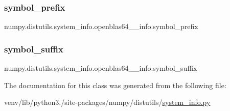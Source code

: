 \subsubsection{\texorpdfstring{symbol\+\_\+prefix}{symbol\_prefix}}
{\footnotesize\ttfamily numpy.\+distutils.\+system\+\_\+info.\+openblas64\+\_\+\+\_\+info.\+symbol\+\_\+prefix\hspace{0.3cm}{\ttfamily [static]}}

\mbox{\label{classnumpy_1_1distutils_1_1system__info_1_1openblas64____info_a175fe499504d066f993832a0ca001755}} 
\subsubsection{\texorpdfstring{symbol\+\_\+suffix}{symbol\_suffix}}
{\footnotesize\ttfamily numpy.\+distutils.\+system\+\_\+info.\+openblas64\+\_\+\+\_\+info.\+symbol\+\_\+suffix\hspace{0.3cm}{\ttfamily [static]}}



The documentation for this class was generated from the following file\+:\begin{DoxyCompactItemize}
\item 
venv/lib/python3./site-\/packages/numpy/distutils/\hyperlink{system__info_8py}{system\+\_\+info.\+py}\end{DoxyCompactItemize}
